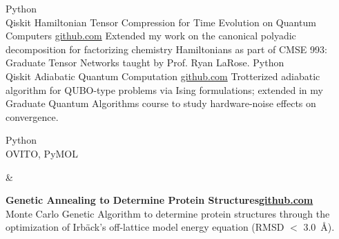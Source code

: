 \documentclass[9pt]{developercv} %
\newcommand{\lastentry}[4]{\parbox[t]{0.15\textwidth}{\small #1}&\parbox[t]{0.85\textwidth}{\textbf{#2}\hfill{\footnotesize \textbf{\textcolor{black}{#3}}}\\#4}\\}
\let\oldhref\href
\newcommand{\linkul}[1]{\setbox0\hbox{#1}\rlap{\textcolor{black!35}{\rule[-1.6pt]{\wd0}{0.3pt}}}\box0}
\renewcommand{\href}[2]{\oldhref{#1}{\linkul{#2}}}
\begin{document}
\newpage
\vspace*{-7pt}
\begin{entrylist}
	\entry 
		{Python \\ Qiskit} 
		{Hamiltonian Tensor Compression for Time Evolution on Quantum Computers}
		{\href{https://github.com/hkbelagali/hamiltonian-tensor-compression}{github.com}}
		{Extended my work on the canonical polyadic decomposition for factorizing chemistry Hamiltonians as part of CMSE 993: Graduate Tensor Networks taught by Prof. Ryan LaRose.}
	\entry
		{Python \\ Qiskit}
		{Adiabatic Quantum Computation}
		{\href{https://github.com/hkbelagali/Adiabatic-Quantum-Computation}{github.com}}
		{Trotterized adiabatic algorithm for QUBO-type problems via Ising formulations; extended in my Graduate Quantum Algorithms course to study hardware-noise effects on convergence.}
	\lastentry
		{Python \\ OVITO, PyMOL}
		{Genetic Annealing to Determine Protein Structures}
		{\href{https://github.com/hkbelagali/Protein-Structure-Prediction}{github.com}}
		{Monte Carlo Genetic Algorithm to determine protein structures through the optimization of Irbäck's off-lattice model energy equation (RMSD $<$ 3.0~\AA).}	

\end{entrylist}
\end{document}
